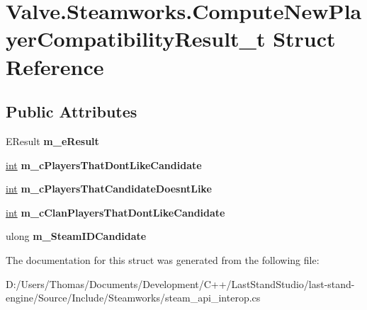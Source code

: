 \hypertarget{structValve_1_1Steamworks_1_1ComputeNewPlayerCompatibilityResult__t}{}\section{Valve.\+Steamworks.\+Compute\+New\+Player\+Compatibility\+Result\+\_\+t Struct Reference}
\label{structValve_1_1Steamworks_1_1ComputeNewPlayerCompatibilityResult__t}
\subsection*{Public Attributes}
\begin{DoxyCompactItemize}
\item 
\hypertarget{structValve_1_1Steamworks_1_1ComputeNewPlayerCompatibilityResult__t_a8927d17b5e1a9405eb4ccd729f132edb}{}E\+Result {\bfseries m\+\_\+e\+Result}\label{structValve_1_1Steamworks_1_1ComputeNewPlayerCompatibilityResult__t_a8927d17b5e1a9405eb4ccd729f132edb}

\item 
\hypertarget{structValve_1_1Steamworks_1_1ComputeNewPlayerCompatibilityResult__t_af229f8e0027244dede1e22a4323c0cdb}{}\hyperlink{SDL__thread_8h_a6a64f9be4433e4de6e2f2f548cf3c08e}{int} {\bfseries m\+\_\+c\+Players\+That\+Dont\+Like\+Candidate}\label{structValve_1_1Steamworks_1_1ComputeNewPlayerCompatibilityResult__t_af229f8e0027244dede1e22a4323c0cdb}

\item 
\hypertarget{structValve_1_1Steamworks_1_1ComputeNewPlayerCompatibilityResult__t_a90e417b72425ce953870503ab015d6c8}{}\hyperlink{SDL__thread_8h_a6a64f9be4433e4de6e2f2f548cf3c08e}{int} {\bfseries m\+\_\+c\+Players\+That\+Candidate\+Doesnt\+Like}\label{structValve_1_1Steamworks_1_1ComputeNewPlayerCompatibilityResult__t_a90e417b72425ce953870503ab015d6c8}

\item 
\hypertarget{structValve_1_1Steamworks_1_1ComputeNewPlayerCompatibilityResult__t_a5d539985aae3900518afd54b84f4fd31}{}\hyperlink{SDL__thread_8h_a6a64f9be4433e4de6e2f2f548cf3c08e}{int} {\bfseries m\+\_\+c\+Clan\+Players\+That\+Dont\+Like\+Candidate}\label{structValve_1_1Steamworks_1_1ComputeNewPlayerCompatibilityResult__t_a5d539985aae3900518afd54b84f4fd31}

\item 
\hypertarget{structValve_1_1Steamworks_1_1ComputeNewPlayerCompatibilityResult__t_a676a38a7f511c1780f549c48db8b396c}{}ulong {\bfseries m\+\_\+\+Steam\+I\+D\+Candidate}\label{structValve_1_1Steamworks_1_1ComputeNewPlayerCompatibilityResult__t_a676a38a7f511c1780f549c48db8b396c}

\end{DoxyCompactItemize}


The documentation for this struct was generated from the following file\+:\begin{DoxyCompactItemize}
\item 
D\+:/\+Users/\+Thomas/\+Documents/\+Development/\+C++/\+Last\+Stand\+Studio/last-\/stand-\/engine/\+Source/\+Include/\+Steamworks/steam\+\_\+api\+\_\+interop.\+cs\end{DoxyCompactItemize}

